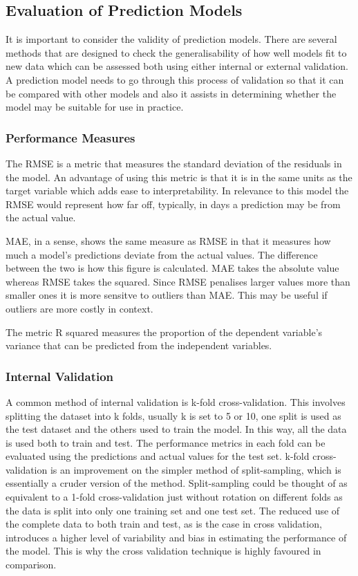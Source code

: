 \documentclass[11pt]{article}
\begin{document}
\subsection{Evaluation of Prediction Models}
It is important to consider the validity of prediction models. There are several methods that are designed to check the generalisability of how well models fit to new data which can be assessed both using either internal or external validation\cite{Jiang2017}. A prediction model needs to go through this process of validation so that it can be compared with other models and also it assists in determining whether the model may be suitable for use in practice.

\subsubsection{Performance Measures}

The RMSE is a metric that measures the standard deviation of the residuals in the model. An advantage of using this metric is that it is in the same units as the target variable which adds ease to interpretability. In relevance to this model the RMSE would represent how far off, typically, in days a prediction may be from the actual value. 

MAE, in a sense, shows the same measure as RMSE in that it measures how much a model's predictions deviate from the actual values. The difference between the two is how this figure is calculated. MAE takes the absolute value whereas RMSE takes the squared. Since RMSE penalises larger values more than smaller ones it is more sensitve to outliers than MAE. This may be useful if outliers are more costly in context.

The metric R squared measures the proportion of the dependent variable's variance that can be predicted from the independent variables.

\subsubsection{Internal Validation}
A common method of internal validation is k-fold cross-validation\cite{Rodrguez2013}. This involves splitting the dataset into k folds, usually k is set to 5 or 10, one split is used as the test dataset and the others used to train the model. In this way, all the data is used both to train and test. The performance metrics in each fold can be evaluated using the predictions and actual values for the test set. k-fold cross-validation is an improvement on the simpler method of split-sampling, which is essentially a cruder version of the method. Split-sampling could be thought of as equivalent to a 1-fold cross-validation just without rotation on different folds as the data is split into only one training set and one test set. The reduced use of the complete data to both train and test, as is the case in cross validation, introduces a higher level of variability and bias in estimating the performance of the model\cite{Varma2006}. This is why the cross validation technique is highly favoured in comparison.
\end{document}
